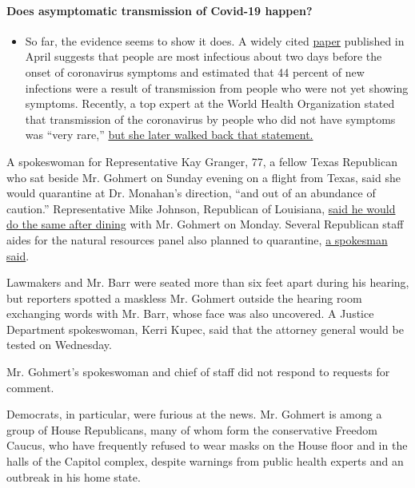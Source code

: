\begin{itemize}
{  \paragraph{Does asymptomatic transmission of Covid-19
  happen?}\label{does-asymptomatic-transmission-of-covid-19-happen}}

  \begin{itemize}
  \tightlist
  \item
    So far, the evidence seems to show it does. A widely cited
    \href{https://www.nature.com/articles/s41591-020-0869-5}{paper}
    published in April suggests that people are most infectious about
    two days before the onset of coronavirus symptoms and estimated that
    44 percent of new infections were a result of transmission from
    people who were not yet showing symptoms. Recently, a top expert at
    the World Health Organization stated that transmission of the
    coronavirus by people who did not have symptoms was ``very rare,''
    \href{https://www.nytimes.com/2020/06/09/world/coronavirus-updates.html?action=click\&pgtype=Article\&state=default\&region=MAIN_CONTENT_3\&context=storylines_faq\#link-1f302e21}{but
    she later walked back that statement.}
  \end{itemize}
\end{itemize}

A spokeswoman for Representative Kay Granger, 77, a fellow Texas
Republican who sat beside Mr. Gohmert on Sunday evening on a flight from
Texas, said she would quarantine at Dr. Monahan's direction, ``and out
of an abundance of caution.'' Representative Mike Johnson, Republican of
Louisiana,
\href{https://twitter.com/RepMikeJohnson/status/1288655872953024512?s=20}{said
he would do the same after dining} with Mr. Gohmert on Monday. Several
Republican staff aides for the natural resources panel also planned to
quarantine,
\href{https://twitter.com/CapitolHacker/status/1288590480121487360?s=20}{a
spokesman said}.

Lawmakers and Mr. Barr were seated more than six feet apart during his
hearing, but reporters spotted a maskless Mr. Gohmert outside the
hearing room exchanging words with Mr. Barr, whose face was also
uncovered. A Justice Department spokeswoman, Kerri Kupec, said that the
attorney general would be tested on Wednesday.

Mr. Gohmert's spokeswoman and chief of staff did not respond to requests
for comment.

Democrats, in particular, were furious at the news. Mr. Gohmert is among
a group of House Republicans, many of whom form the conservative Freedom
Caucus, who have frequently refused to wear masks on the House floor and
in the halls of the Capitol complex, despite warnings from public health
experts and an outbreak in his home state.

